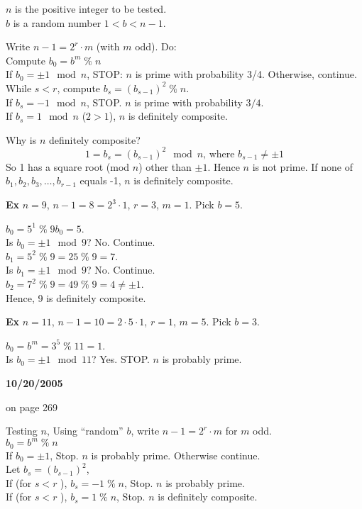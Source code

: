 $n$ is the positive integer to be tested.\\
$b$ is a random number $1 < b < n-1$.

Write $n-1 = 2^r \cdot m$ (with $m$ odd).
Do:\\
Compute $b_0 = b^m \;\%\; n$\\
If $b_0 = \pm 1 \mod n$, STOP: $n$ is prime with probability 3/4. Otherwise, continue.\\
While $s<r$, compute $b_s = (b_{s-1})^2 \;\%\; n$.\\
If $b_s = -1 \mod n$, STOP. $n$ is prime with probability $3/4$.\\
If $b_s = 1 \mod n$ ($2>1$), $n$ is definitely composite.

Why is $n$ definitely composite?
\[
1 = b_s = (b_{s-1})^2 \mod n\mbox{, where } b_{s-1} \neq \pm 1
\]
So 1 has a square root (mod $n$) other than $\pm 1$. Hence $n$ is not prime. If none of \\ $b_1,b_2,b_3,\ldots,b_{r-1}$ equals -1, $n$ is definitely composite.

\textbf{Ex} $n=9$, $n-1 = 8 = 2^3 \cdot 1$, $r=3$, $m=1$. Pick $b=5$.

$b_0 = 5^1 \;\%\; 9$\quad $b_0 = 5$.\\
Is $b_0 = \pm 1 \mod 9$? No. Continue.\\
$b_1 = 5^2 \;\%\; 9 = 25 \;\%\; 9 = 7$.\\
Is $b_1 = \pm 1 \mod 9$? No. Continue.\\
$b_2 = 7^2 \;\%\; 9 = 49 \;\%\; 9 = 4 \neq \pm 1$.\\
Hence, 9 is definitely composite.

\textbf{Ex} $n=11$, $n-1 = 10 = 2 \cdot 5 \cdot 1$, $r=1$, $m=5$. Pick $b=3$.

$b_0 = b^m = 3^5 \;\%\; 11 = 1$.\\
Is $b_0 = \pm 1 \mod 11$? Yes. STOP. $n$ is probably prime.

\textbf{10/20/2005}

on page 269

Testing $n$, Using  ``random'' $b$, write $n-1 = 2^r \cdot m$ for $m$ odd.\\
$b_0 = b^m \;\%\; n$\\
If $b_0 = \pm 1$, Stop. $n$ is probably prime. Otherwise continue.\\
Let $b_s = (b_{s-1})^2$,\\
If (for $s < r$ ), $b_s = -1 \;\%\; n$, Stop. $n$ is probably prime.\\
If (for $s < r$ ), $b_s = 1 \;\%\; n$, Stop. $n$ is definitely composite.


